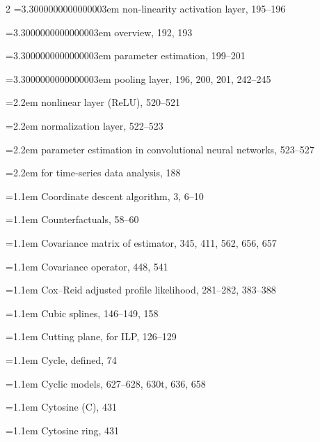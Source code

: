 \begin{multicols}{2}
\noindent\hangindent=3.3000000000000003em \hspace*{2.2em}non-linearity activation layer, 195--196\par
\noindent\hangindent=3.3000000000000003em \hspace*{2.2em}overview, 192, 193\par
\noindent\hangindent=3.3000000000000003em \hspace*{2.2em}parameter estimation, 199--201\par
\noindent\hangindent=3.3000000000000003em \hspace*{2.2em}pooling layer, 196, 200, 201, 242--245\par
\noindent\hangindent=2.2em \hspace*{1.1em}nonlinear layer (ReLU), 520--521\par
\noindent\hangindent=2.2em \hspace*{1.1em}normalization layer, 522--523\par
\noindent\hangindent=2.2em \hspace*{1.1em}parameter estimation in convolutional neural networks, 523--527\par
\noindent\hangindent=2.2em \hspace*{1.1em}for time-series data analysis, 188\par
\noindent\hangindent=1.1em Coordinate descent algorithm, 3, 6--10\par
\noindent\hangindent=1.1em Counterfactuals, 58--60\par
\noindent\hangindent=1.1em Covariance matrix of estimator, 345, 411, 562, 656, 657\par
\noindent\hangindent=1.1em Covariance operator, 448, 541\par
\noindent\hangindent=1.1em Cox--Reid adjusted profile likelihood, 281--282, 383--388\par
\noindent\hangindent=1.1em Cubic splines, 146--149, 158\par
\noindent\hangindent=1.1em Cutting plane, for ILP, 126--129\par
\noindent\hangindent=1.1em Cycle, defined, 74\par
\noindent\hangindent=1.1em Cyclic models, 627--628, 630t, 636, 658\par
\noindent\hangindent=1.1em Cytosine (C), 431\par
\noindent\hangindent=1.1em Cytosine ring, 431\par


\end{multicols}

